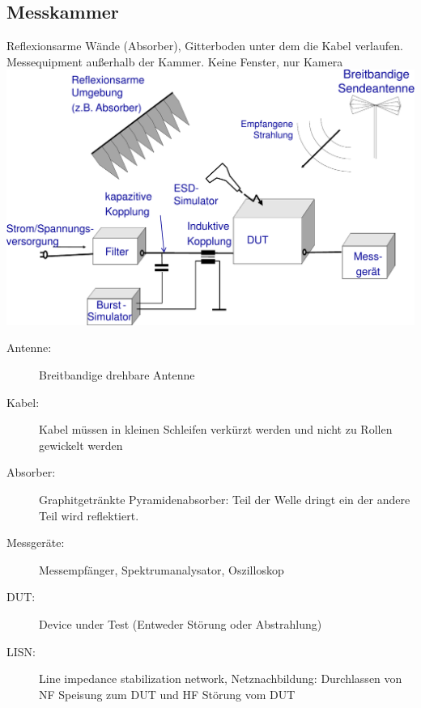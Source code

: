 \documentclass[fs, footer]{latex4ei}
\begin{document}
\begin{multicols*}{4}
{	\subsection{Messkammer}
	Reflexionsarme Wände (Absorber), Gitterboden unter dem die Kabel verlaufen. Messequipment außerhalb der Kammer. Keine Fenster, nur Kamera\\
	\includegraphics[width = \columnwidth]{./img/messung.pdf}
	\begin{description}
		\item[Antenne:] Breitbandige drehbare Antenne
		\item[Kabel:] Kabel müssen in kleinen Schleifen verkürzt werden und nicht zu Rollen gewickelt werden
		\item[Absorber:] Graphitgetränkte Pyramidenabsorber: Teil der Welle dringt ein der andere Teil wird reflektiert.
		\item[Messgeräte:] Messempfänger, Spektrumanalysator, Oszilloskop
		\item[DUT:] Device under Test (Entweder Störung oder Abstrahlung)
		\item[LISN:] Line impedance stabilization network, Netznachbildung: Durchlassen von NF Speisung zum DUT und HF Störung vom DUT
	\end{description}
}

\sectionbox{
}
\end{multicols*}
\end{document}

